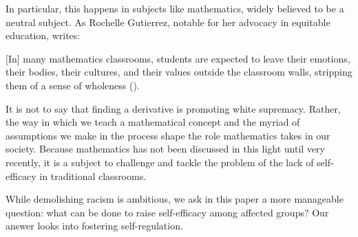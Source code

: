 In particular, this happens in subjects like mathematics, widely believed to be a neutral subject. As Rochelle Gutierrez, notable for her advocacy in equitable education, writes:
\begin{displayquote}
  {[In]} many mathematics classrooms, students are expected to leave their emotions, their bodies, their cultures, and their values outside the classroom walls, stripping them of a sense of wholeness (\cite{gutierrez_embracing_2012}).
\end{displayquote}
It is not to say that finding a derivative is promoting white supremacy. Rather, the way in which we teach a mathematical concept and the myriad of assumptions we make in the process shape the role mathematics takes in our society. Because mathematics has not been discussed in this light until very recently, it is a subject to challenge and tackle the problem of the lack of self-efficacy in traditional classrooms.

While demolishing racism is ambitious, we ask in this paper a more manageable question: what can be done to raise self-efficacy among affected groups? Our answer looks into fostering self-regulation.
